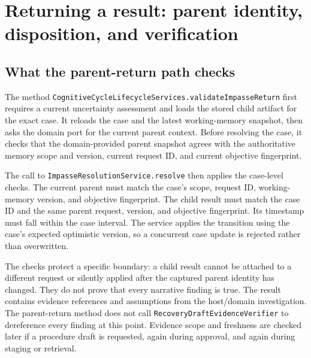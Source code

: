 \section{Returning a result: parent identity, disposition, and verification}
\label{sec:ch22-parent-return}

\subsection{What the parent-return path checks}
\label{subsec:ch22-return-checks}

The method \texttt{Cognitive\allowbreak Cycle\allowbreak Lifecycle\allowbreak Services.\allowbreak validate\allowbreak Impasse\allowbreak Return} first requires a current uncertainty assessment and loads the stored child artifact for the exact case. It reloads the case and the latest working-memory snapshot, then asks the domain port for the current parent context. Before resolving the case, it checks that the domain-provided parent snapshot agrees with the authoritative memory scope and version, current request ID, and current objective fingerprint.

The call to \texttt{Impasse\allowbreak Resolution\allowbreak Service.\allowbreak resolve} then applies the case-level checks. The current parent must match the case's scope, request ID, working-memory version, and objective fingerprint. The child result must match the case ID and the same parent request, version, and objective fingerprint. Its timestamp must fall within the case interval. The service applies the transition using the case's expected optimistic version, so a concurrent case update is rejected rather than overwritten.

The checks protect a specific boundary: a child result cannot be attached to a different request or silently applied after the captured parent identity has changed. They do not prove that every narrative finding is true. The result contains evidence references and assumptions from the host/domain investigation. The parent-return method does not call \texttt{Recovery\allowbreak Draft\allowbreak Evidence\allowbreak Verifier} to dereference every finding at this point. Evidence scope and freshness are checked later if a procedure draft is requested, again during approval, and again during staging or retrieval.


